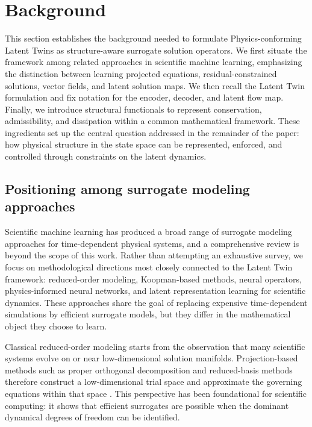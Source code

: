 \documentclass[a4paper,fleqn]{cas-sc}
\theoremstyle{thmstyleone}%
\theoremstyle{thmstyletwo}%
\theoremstyle{thmstylethree}%
\begin{document}
\section{Background}\label{sec:background}

This section establishes the background needed to formulate Physics-conforming Latent Twins as structure-aware surrogate solution operators. We first situate the framework among related approaches in scientific machine learning, emphasizing the distinction between learning projected equations, residual-constrained solutions, vector fields, and latent solution maps. We then recall the Latent Twin formulation and fix notation for the encoder, decoder, and latent flow map. Finally, we introduce structural functionals to represent conservation, admissibility, and dissipation within a common mathematical framework. These ingredients set up the central question addressed in the remainder of the paper: how physical structure in the state space can be represented, enforced, and controlled through constraints on the latent dynamics.

\subsection{Positioning among surrogate modeling approaches} \label{sec:surrogate-positioning}
Scientific machine learning has produced a broad range of surrogate modeling approaches for time-dependent physical systems, and a comprehensive review is beyond the scope of this work. Rather than attempting an exhaustive survey, we focus on methodological directions most closely connected to the Latent Twin framework: reduced-order modeling, Koopman-based methods, neural operators, physics-informed neural networks, and latent representation learning for scientific dynamics. These approaches share the goal of replacing expensive time-dependent simulations by efficient surrogate models, but they differ in the mathematical object they choose to learn.

Classical reduced-order modeling starts from the observation that many scientific systems evolve on or near low-dimensional solution manifolds. Projection-based methods such as proper orthogonal decomposition and reduced-basis methods therefore construct a low-dimensional trial space and approximate the governing equations within that space \cite{benner2015survey,hesthaven2016certified}. This perspective has been foundational for scientific computing: it shows that efficient surrogates are possible when the dominant dynamical degrees of freedom can be identified.
\end{document}
